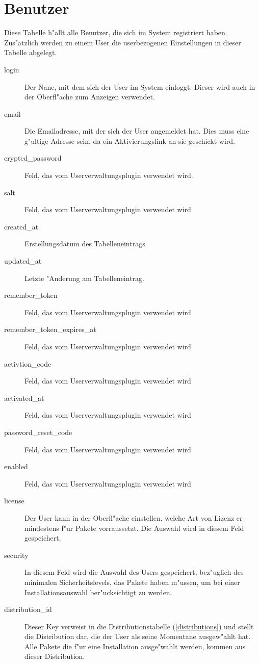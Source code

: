 \documentclass{article}
\begin{document}
\section{Benutzer}
\label{users}

Diese Tabelle h"allt alle Benutzer, die sich im System registriert haben. Zus"atzlich werden zu einem User die userbezogenen Einstellungen in dieser Tabelle abgelegt.

\begin{description}
\item[login] Der Nane, mit dem sich der User im System einloggt. Dieser wird auch in der Oberfl"ache zum Anzeigen verwendet.
\item[email] Die Emailadresse, mit der sich der User angemeldet hat. Dies muss eine g"ultige Adresse sein, da ein Aktivierungslink an sie geschickt wird.
\item[crypted\_password] Feld, das vom Userverwaltungsplugin verwendet wird.
\item[salt] Feld, das vom Userverwaltungsplugin verwendet wird
\item[created\_at] Erstellungsdatum des Tabelleneintrags.
\item[updated\_at] Letzte "Anderung am Tabelleneintrag.
\item[remember\_token] Feld, das vom Userverwaltungsplugin verwendet wird
\item[remember\_token\_expires\_at] Feld, das vom Userverwaltungsplugin verwendet wird
\item[activtion\_code] Feld, das vom Userverwaltungsplugin verwendet wird
\item[activated\_at] Feld, das vom Userverwaltungsplugin verwendet wird
\item[password\_reset\_code] Feld, das vom Userverwaltungsplugin verwendet wird
\item[enabled] Feld, das vom Userverwaltungsplugin verwendet wird
\item[license] Der User kann in der Oberfl"ache einstellen, welche Art von Lizenz er mindestens f"ur Pakete vorraussetzt. Die Auswahl wird in diesem Feld gespeichert.
\item[security] In diesem Feld wird die Auswahl des Users gespeichert, bez"uglich des minimalen Sicherheitslevels, das Pakete haben m"ussen, um bei einer Installationsauswahl ber"ucksichtigt zu werden.
\item[distribution\_id] Dieser Key verweist in die Distributionstabelle (\ref{distributions}) und stellt die Distribution dar, die der User als seine Momentane ausgew"ahlt hat. Alle Pakete die f"ur eine Installation ausge"wahlt werden, kommen aus dieser Distribution.

\end{description}
\end{document}
